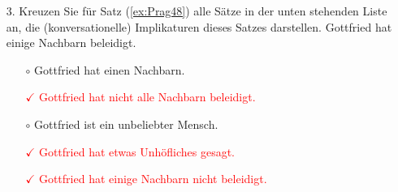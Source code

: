 {\begin{frame}
\begin{enumerate}
\end{enumerate}

\end{frame}


\begin{frame}

\begin{enumerate}
\item[3.] Kreuzen Sie für Satz (\ref{ex:Prag48}) alle Sätze in der unten stehenden Liste an, die (konversationelle) Implikaturen dieses Satzes darstellen.
\ea \label{ex:Prag48} Gottfried hat einige Nachbarn beleidigt.
\z 
\begin{itemize}
	\item[$\circ$] Gottfried hat einen Nachbarn.
	\item[\textcolor{red}{$\checkmark$}] \textcolor{red}{Gottfried hat nicht alle Nachbarn beleidigt.}
	\item[$\circ$] Gottfried ist ein unbeliebter Mensch.
	\item[\textcolor{red}{$\checkmark$}] \textcolor{red}{Gottfried hat etwas Unhöfliches gesagt.}
	\item[\textcolor{red}{$\checkmark$}] \textcolor{red}{Gottfried hat einige Nachbarn nicht beleidigt.}
\end{itemize}

\end{enumerate}

\end{frame}

}
